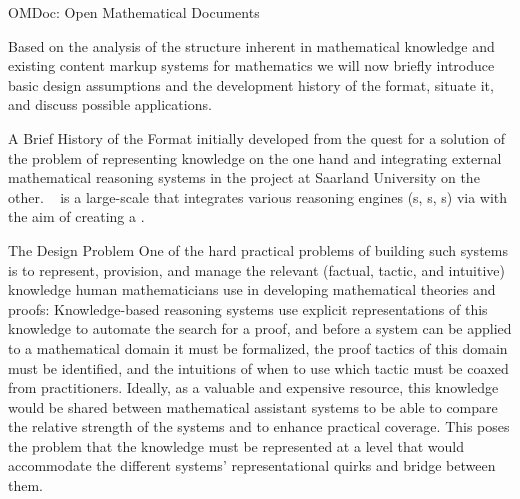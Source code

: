 
\begin{tchapter}[id=omdoc-markup,short=Open Mathematical Documents]{OMDoc: Open Mathematical Documents}

  Based on the analysis of the structure inherent in mathematical knowledge and existing
  content markup systems for mathematics we will now briefly introduce basic design
  assumptions and the development history of the {\omdoc} format, situate it, and discuss
  possible applications.

  \begin{tsection}[id=omdoc-history]{A Brief History of the {\omdoc} Format}
    {\omdoc} initially developed from the quest for a solution of the problem of
    representing knowledge on the one hand and integrating external mathematical reasoning
    systems in the {\OMEGA} project at Saarland University on the
    other. {\OMEGA}~\cite{SiekmannEtAl:pdwo02} is a large-scale
    {} that integrates various reasoning engines
    ({s}, {s},
    {s}) via
    {} with the aim of creating a
    {}.

    \begin{tsubsection}{The Design Problem}
      One of the hard practical problems of building such systems is to represent,
      provision, and manage the relevant (factual, tactic, and
      intuitive) knowledge human mathematicians use in
      developing mathematical theories and proofs: Knowledge-based reasoning systems use
      explicit representations of this knowledge to automate the search for a proof, and
      before a system can be applied to a mathematical domain it must be formalized, the
      proof tactics of this domain must be identified, and the intuitions of when to use
      which tactic must be coaxed from practitioners. Ideally, as a valuable and expensive
      resource, this knowledge would be shared between mathematical assistant systems to
      be able to compare the relative strength of the systems and to enhance practical
      coverage. This poses the problem that the knowledge must be represented at a level
      that would accommodate the different systems' representational quirks and bridge
      between them.


\end{tsubsection}
\end{tsection}
\end{tchapter}
